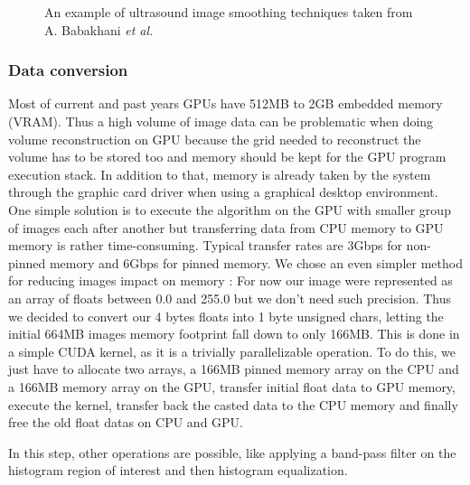 \documentclass[12pt,journal,compsoc]{IEEEtran}
\begin{document}
\begin{figure}[!t]
\centering
{}
\hfil
{}
\caption{An example of ultrasound image smoothing techniques taken from A. Babakhani \textit{et al.}\cite{1}}
\label{comparisson_smoothing}
\end{figure}

\subsubsection{Data conversion}

Most of current and past years GPUs have 512MB to 2GB embedded memory (VRAM). Thus a high volume of image data can be problematic when doing volume reconstruction on GPU because the grid needed to reconstruct the volume has to be stored too and memory should be kept for the GPU program execution stack. In addition to that, memory is already taken by the system through the graphic card driver when using a graphical desktop environment. 
One simple solution is to execute the algorithm on the GPU with smaller group of images each after another but transferring data from CPU memory to GPU memory is rather time-consuming. 
Typical transfer rates are 3Gbps for non-pinned memory and 6Gbps for pinned memory.
We chose an even simpler method for reducing images impact on memory : For now our image were represented as an array of floats between 0.0 and 255.0 but we don't need such precision. Thus we decided to convert our 4 bytes floats into 1 byte unsigned chars, letting the initial 664MB images memory footprint fall down to only 166MB. This is done in a simple CUDA kernel, as it is a trivially parallelizable operation. To do this, we just have to allocate two arrays, a 166MB pinned memory array on the CPU and a 166MB memory array on the GPU, transfer initial float data to GPU memory, execute the kernel, transfer back the casted data to the CPU memory and finally free the old float datas on CPU and GPU.\par
In this step, other operations are possible, like applying a band-pass filter on the histogram region of interest and then histogram equalization.
	
\end{document}
